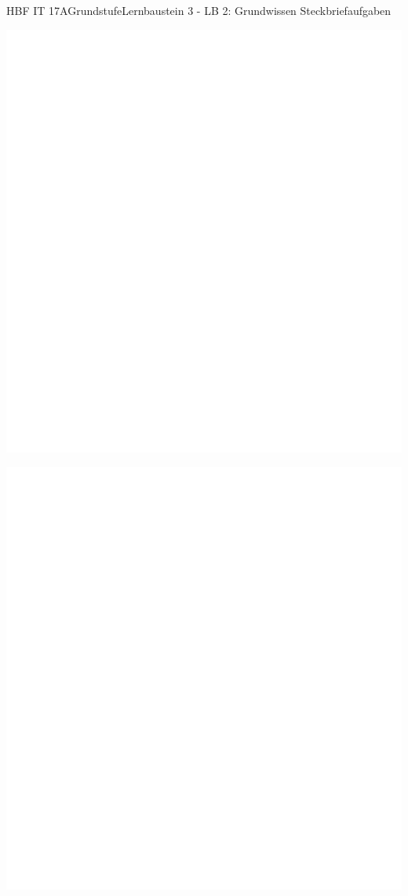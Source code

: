 \documentclass[oneside,openany,headings=optiontotoc,11pt,numbers=noenddot]{scrreprt}
\begin{document}
\begin{worksheet}{HBF IT 17A}{Grundstufe}{Lernbaustein 3 - LB 2: Grundwissen Steckbriefaufgaben}
\begin{framed}
			\includegraphics[scale=1]{../empty.jpg}
		\end{framed}
		\begin{framed}
			\includegraphics[scale=0.53]{../empty.jpg}

\end{framed}
\end{worksheet}
\end{document}
